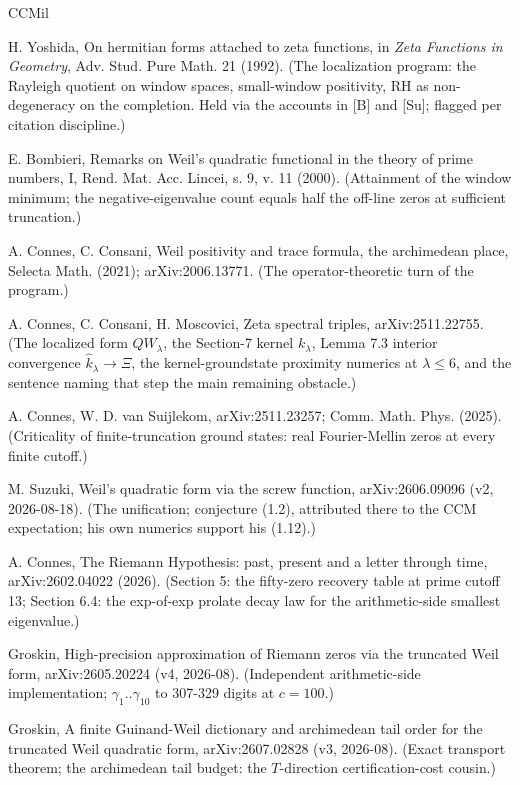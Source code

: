 \documentclass[10pt]{article}
\begin{document}
\begin{thebibliography}{CCMil}

 H. Yoshida, On hermitian forms attached to zeta functions, in \emph{Zeta Functions in Geometry}, Adv. Stud. Pure Math. 21 (1992). (The localization program: the Rayleigh quotient on window spaces, small-window positivity, RH as non-degeneracy on the completion. Held via the accounts in [B] and [Su]; flagged per citation discipline.)

 E. Bombieri, Remarks on Weil's quadratic functional in the theory of prime numbers, I, Rend. Mat. Acc. Lincei, s. 9, v. 11 (2000). (Attainment of the window minimum; the negative-eigenvalue count equals half the off-line zeros at sufficient truncation.)

 A. Connes, C. Consani, Weil positivity and trace formula, the archimedean place, Selecta Math. (2021); arXiv:2006.13771. (The operator-theoretic turn of the program.)

 A. Connes, C. Consani, H. Moscovici, Zeta spectral triples, arXiv:2511.22755. (The localized form $QW_\lambda$, the Section-7 kernel $k_\lambda$, Lemma 7.3 interior convergence $\hat k_\lambda \to \Xi$, the kernel-groundstate proximity numerics at $\lambda \le 6$, and the sentence naming that step the main remaining obstacle.)

 A. Connes, W. D. van Suijlekom, arXiv:2511.23257; Comm. Math. Phys. (2025). (Criticality of finite-truncation ground states: real Fourier-Mellin zeros at every finite cutoff.)

 M. Suzuki, Weil's quadratic form via the screw function, arXiv:2606.09096 (v2, 2026-08-18). (The unification; conjecture (1.2), attributed there to the CCM expectation; his own numerics support his (1.12).)

 A. Connes, The Riemann Hypothesis: past, present and a letter through time, arXiv:2602.04022 (2026). (Section 5: the fifty-zero recovery table at prime cutoff 13; Section 6.4: the exp-of-exp prolate decay law for the arithmetic-side smallest eigenvalue.)

 Groskin, High-precision approximation of Riemann zeros via the truncated Weil form, arXiv:2605.20224 (v4, 2026-08). (Independent arithmetic-side implementation; $\gamma_1..\gamma_{10}$ to 307-329 digits at $c = 100$.)

 Groskin, A finite Guinand-Weil dictionary and archimedean tail order for the truncated Weil quadratic form, arXiv:2607.02828 (v3, 2026-08). (Exact transport theorem; the archimedean tail budget: the $T$-direction certification-cost cousin.)


\end{thebibliography}
\end{document}
